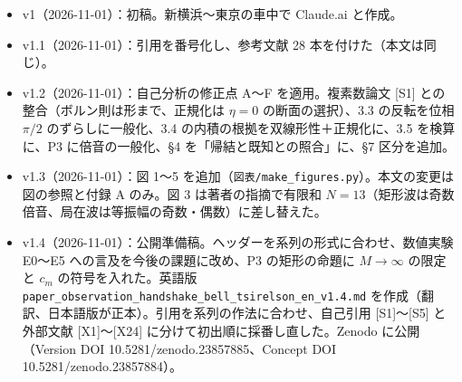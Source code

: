 \documentclass[
  a4paper,
]{ltjsarticle}
\providecommand{\tightlist}{%
  \setlength{\itemsep}{0pt}\setlength{\parskip}{0pt}}
\begin{document}
\begin{itemize}
\tightlist
\item
  v1（2026-11-01）：初稿。新横浜〜東京の車中で Claude.ai と作成。
\item
  v1.1（2026-11-01）：引用を番号化し、参考文献 28
  本を付けた（本文は同じ）。
\item
  v1.2（2026-11-01）：自己分析の修正点 A〜F を適用。複素数論文 {[}S1{]}
  との整合（ボルン則は形まで、正規化は \(\eta=0\) の断面の選択）、3.3
  の反転を位相 \(\pi/2\) のずらしに一般化、3.4
  の内積の根拠を双線形性＋正規化に、3.5 を検算に、P3 に倍音の一般化、§4
  を「帰結と既知との照合」に、§7 区分を追加。
\item
  v1.3（2026-11-01）：図 1〜5
  を追加（\texttt{図表/\allowbreak{}make\_\allowbreak{}figures.py}）。本文の変更は図の参照と付録 A
  のみ。図 3 は著者の指摘で有限和
  \(N=13\)（矩形波は奇数倍音、局在波は等振幅の奇数・偶数）に差し替えた。
\item
  v1.4（2026-11-01）：公開準備稿。ヘッダーを系列の形式に合わせ、数値実験
  E0〜E5 への言及を今後の課題に改め、P3 の矩形の命題に \(M\to\infty\)
  の限定と \(c_m\) の符号を入れた。英語版
  \texttt{paper\_\allowbreak{}observation\_\allowbreak{}handshake\_\allowbreak{}bell\_\allowbreak{}tsirelson\_\allowbreak{}en\_\allowbreak{}v1.4.md}
  を作成（翻訳、日本語版が正本）。引用を系列の作法に合わせ、自己引用
  {[}S1{]}〜{[}S5{]} と外部文献 {[}X1{]}〜{[}X24{]}
  に分けて初出順に採番し直した。Zenodo に公開（Version DOI
  10.5281/zenodo.23857885、Concept DOI 10.5281/zenodo.23857884）。
\end{itemize}
\end{document}
